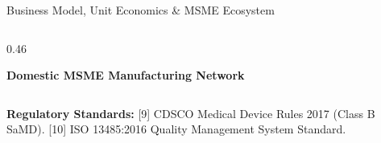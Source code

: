 \documentclass[aspectratio=169, 11pt]{beamer}
\begin{document}
\begin{frame}{Business Model, Unit Economics \& MSME Ecosystem}
\begin{columns}[c]
\begin{column}{0.46\textwidth}
\begin{block}{\textcolor{neonAmber}{\textbf{Domestic MSME Manufacturing Network}}}
                \vspace{0.2cm}
            \end{block}
        \end{column}
    \end{columns}
    
    \vspace{0.01cm}
    \begin{block}{}
        \tiny \textcolor{neonCyan}{\textbf{Regulatory Standards:}} \textcolor{mutedText}{[9] CDSCO Medical Device Rules 2017 (Class B SaMD). [10] ISO 13485:2016 Quality Management System Standard.}
    \end{block}
\end{frame}
\end{document}
